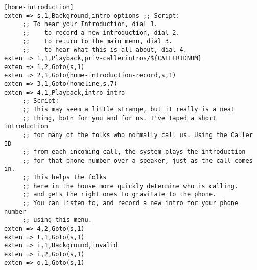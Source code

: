 \begin{verbatim}
[home-introduction]
exten => s,1,Background,intro-options ;; Script: 
     ;; To hear your Introduction, dial 1.
     ;;    to record a new introduction, dial 2.
     ;;    to return to the main menu, dial 3.
     ;;    to hear what this is all about, dial 4.
exten => 1,1,Playback,priv-callerintros/${CALLERIDNUM}
exten => 1,2,Goto(s,1)
exten => 2,1,Goto(home-introduction-record,s,1)
exten => 3,1,Goto(homeline,s,7)
exten => 4,1,Playback,intro-intro
     ;; Script:
     ;; This may seem a little strange, but it really is a neat
     ;; thing, both for you and for us. I've taped a short introduction
     ;; for many of the folks who normally call us. Using the Caller ID
     ;; from each incoming call, the system plays the introduction
     ;; for that phone number over a speaker, just as the call comes in.
     ;; This helps the folks
     ;; here in the house more quickly determine who is calling.
     ;; and gets the right ones to gravitate to the phone.
     ;; You can listen to, and record a new intro for your phone number
     ;; using this menu.
exten => 4,2,Goto(s,1)
exten => t,1,Goto(s,1)
exten => i,1,Background,invalid
exten => i,2,Goto(s,1)
exten => o,1,Goto(s,1)


\end{verbatim}
